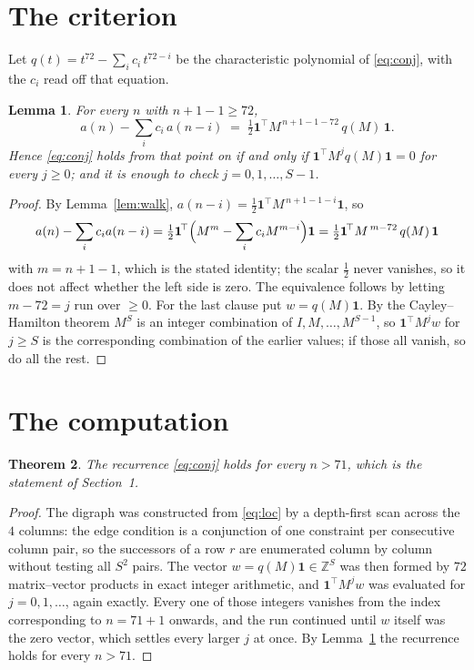 \documentclass[11pt,a4paper]{article}
\theoremstyle{plain}
\newtheorem{theorem}{Theorem}
\newtheorem{lemma}[theorem]{Lemma}
\theoremstyle{definition}
\begin{document}
\section{The criterion}

Let $q(t)=t^{72}-\sum_i c_i\,t^{72-i}$ be the characteristic polynomial of
\eqref{eq:conj}, with the $c_i$ read off that equation.

\begin{lemma}\label{lem:crit}
For every $n$ with $n+1-1\ge72$,
\[
a(n)-\sum_i c_i\,a(n-i)\;=\;\tfrac1{2}\mathbf{1}^{\!\top}M^{\,n+1-1-72}\,q(M)\,\mathbf{1} .
\]
Hence \eqref{eq:conj} holds from that point on if and only if
$\mathbf{1}^{\!\top}M^{j}q(M)\mathbf{1}=0$ for every $j\ge0$; and it is enough to check
$j=0,1,\dots,S-1$.
\end{lemma}

\begin{proof}
By Lemma~\ref{lem:walk}, $a(n-i)=\tfrac1{2}\mathbf{1}^{\!\top}M^{\,n+1-1-i}\mathbf{1}$, so
\[
a(n)-\sum_i c_i a(n-i)
=\tfrac1{2}\mathbf{1}^{\!\top}\Bigl(M^{m}-\sum_i c_i M^{m-i}\Bigr)\mathbf{1}
=\tfrac1{2}\mathbf{1}^{\!\top}M^{\,m-72}\,q(M)\,\mathbf{1}
\]
with $m=n+1-1$, which is the stated identity; the scalar $\tfrac1{2}$ never vanishes, so
it does not affect whether the left side is zero. The equivalence follows by letting
$m-72=j$ run over $\ge0$. For the last clause put $w=q(M)\mathbf{1}$. By the
Cayley--Hamilton theorem $M^{S}$ is an integer combination of $I,M,\dots,M^{S-1}$, so
$\mathbf{1}^{\!\top}M^{j}w$ for $j\ge S$ is the corresponding combination of the earlier
values; if those all vanish, so do all the rest.
\end{proof}

\section{The computation}

\begin{theorem}
The recurrence \eqref{eq:conj} holds for every $n>71$, which is the statement of
Section~1.
\end{theorem}

\begin{proof}
The digraph was constructed from \eqref{eq:loc} by a depth-first scan across the $4$
columns: the edge condition is a conjunction of one constraint per consecutive column
pair, so the successors of a row $r$ are enumerated column by column without testing all
$S^2$ pairs. The vector $w=q(M)\mathbf{1}\in\mathbb{Z}^{S}$ was then formed by $72$
matrix--vector products in exact integer arithmetic, and $\mathbf{1}^{\!\top}M^{j}w$ was
evaluated for $j=0,1,\dots$, again exactly. Every one of those integers vanishes from the
index corresponding to $n=71+1$ onwards, and the run continued until $w$ itself was the
zero vector, which settles every larger $j$ at once. By Lemma~\ref{lem:crit} the recurrence
holds for every $n>71$.
\end{proof}
\end{document}
